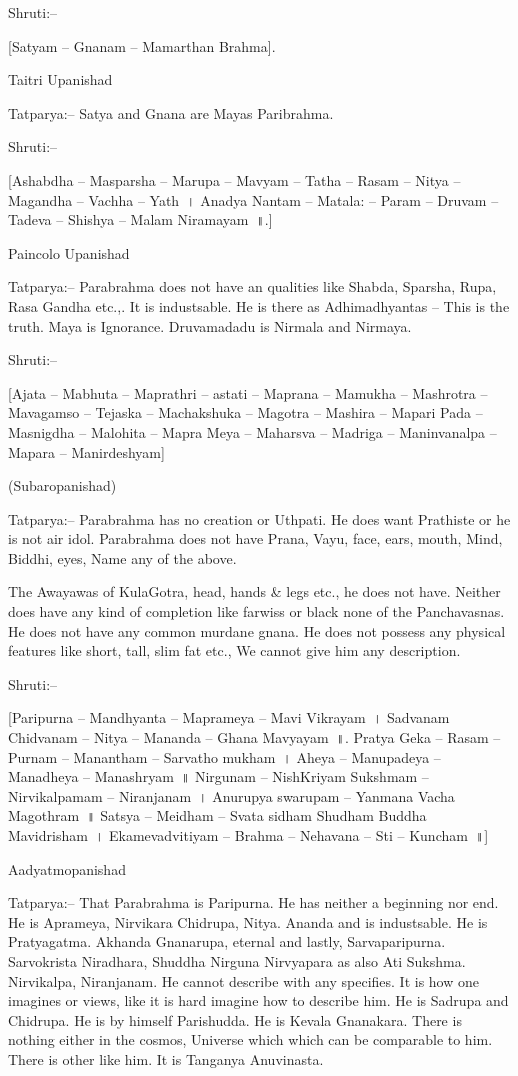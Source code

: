 Shruti:–

[Satyam – Gnanam – Mamarthan Brahma].

Taitri Upanishad

Tatparya:– Satya and Gnana are Mayas Paribrahma.

Shruti:–

[Ashabdha – Masparsha – Marupa – Mavyam – Tatha – Rasam – Nitya – Magandha – Vachha – Yath~। Anadya Nantam – Matala: – Param – Druvam –Tadeva – Shishya – Malam Niramayam~॥.]

Paincolo Upanishad

Tatparya:– Parabrahma does not have an qualities like Shabda, Sparsha, Rupa, Rasa Gandha etc.,. It is industsable. He is there as Adhimadhyantas – This is the truth. Maya is Ignorance. Druvamadadu is Nirmala and Nirmaya.

Shruti:–

[Ajata – Mabhuta – Maprathri – astati – Maprana – Mamukha – Mashrotra – Mavagamso – Tejaska – Machakshuka – Magotra – Mashira – Mapari Pada – Masnigdha – Malohita – Mapra Meya – Maharsva – Madriga – Maninvanalpa – Mapara – Manirdeshyam]

(Subaropanishad)

Tatparya:– Parabrahma has no creation or Uthpati. He does want Prathiste or he is not air idol. Parabrahma does not have Prana, Vayu, face, ears, mouth, Mind, Biddhi, eyes, Name any of the above.

The Awayawas of KulaGotra, head, hands \& legs etc., he does not have. Neither does have any kind of completion like farwiss or black none of the Panchavasnas. He does not have any common murdane gnana. He does not possess any physical features like short, tall, slim fat etc., We cannot give him any description.

Shruti:–

[Paripurna – Mandhyanta – Maprameya – Mavi Vikrayam~। Sadvanam Chidvanam – Nitya – Mananda – Ghana Mavyayam~॥. Pratya Geka – Rasam – Purnam – Manantham – Sarvatho mukham~। Aheya – Manupadeya – Manadheya – Manashryam~॥ Nirgunam – NishKriyam Sukshmam – Nirvikalpamam – Niranjanam~। Anurupya swarupam – Yanmana Vacha Magothram~॥ Satsya – Meidham – Svata sidham Shudham Buddha Mavidrisham~। Ekamevadvitiyam – Brahma – Nehavana – Sti – Kuncham~॥]

Aadyatmopanishad

Tatparya:– That Parabrahma is Paripurna. He has neither a beginning nor end. He is Aprameya, Nirvikara Chidrupa, Nitya. Ananda and is industsable. He is Pratyagatma. Akhanda Gnanarupa, eternal and lastly, Sarvaparipurna. Sarvokrista Niradhara, Shuddha Nirguna Nirvyapara as also Ati Sukshma. Nirvikalpa, Niranjanam. He cannot describe with any specifies. It is how one imagines or views, like it is hard imagine how to describe him. He is Sadrupa and Chidrupa. He is by himself Parishudda. He is Kevala Gnanakara. There is nothing either in the cosmos, Universe which which can be comparable to him. There is other like him. It is Tanganya Anuvinasta.

